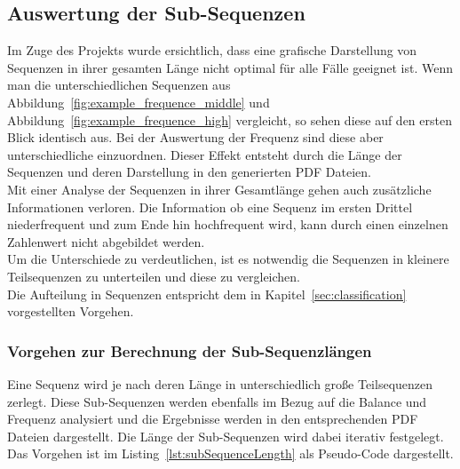 \subsection{Auswertung der Sub-Sequenzen}
Im Zuge des Projekts wurde ersichtlich, dass eine grafische Darstellung von Sequenzen in ihrer gesamten Länge nicht optimal für alle Fälle geeignet ist.
Wenn man die unterschiedlichen Sequenzen aus Abbildung~\ref{fig:example_frequence_middle} und Abbildung~\ref{fig:example_frequence_high} vergleicht, so sehen diese auf den ersten Blick identisch aus.
Bei der Auswertung der Frequenz sind diese aber unterschiedliche einzuordnen.
Dieser Effekt entsteht durch die Länge der Sequenzen und deren Darstellung in den generierten PDF Dateien.\\
Mit einer Analyse der Sequenzen in ihrer Gesamtlänge gehen auch zusätzliche Informationen verloren. Die Information ob eine Sequenz im ersten Drittel niederfrequent und zum Ende hin hochfrequent wird, kann durch einen einzelnen Zahlenwert nicht abgebildet werden.\\
Um die Unterschiede zu verdeutlichen, ist es notwendig die Sequenzen in kleinere Teilsequenzen zu unterteilen und diese zu vergleichen.\\
Die Aufteilung in Sequenzen entspricht dem in Kapitel~\ref{sec:classification} vorgestellten Vorgehen.

\subsubsection{Vorgehen zur Berechnung der Sub-Sequenzlängen}
Eine Sequenz wird je nach deren Länge in unterschiedlich große Teilsequenzen zerlegt. Diese Sub-Sequenzen werden ebenfalls im Bezug auf die Balance und Frequenz analysiert und die Ergebnisse werden in den entsprechenden PDF Dateien dargestellt.
Die Länge der Sub-Sequenzen wird dabei iterativ festgelegt. Das Vorgehen ist im Listing~\ref{lst:subSequenceLength} als Pseudo-Code dargestellt.\\

{}{}

